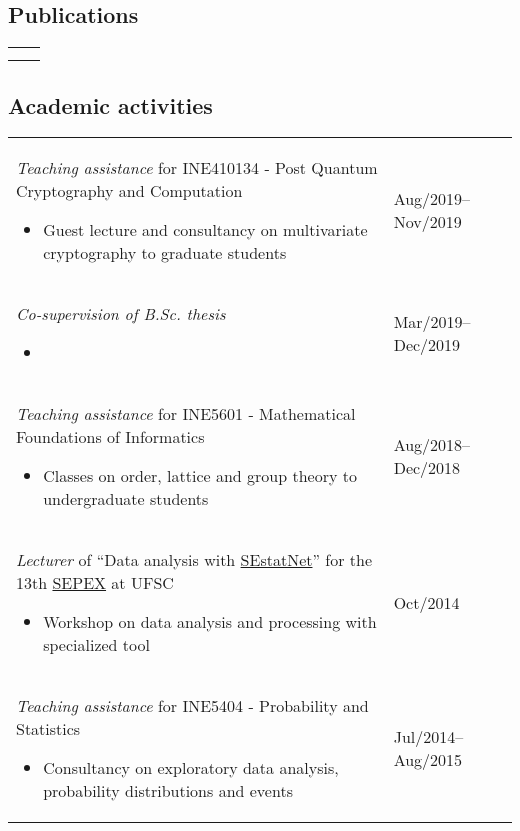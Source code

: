 \documentclass[12pt]{article}
\makeatletter
\newenvironment{datetable}
  {\newcolumntype{R}{>{\raggedleft\arraybackslash}p{0.14\textwidth}}
   \newcolumntype{L}{p{0.84\textwidth}}
   \begin{tabular}{@{\hspace{0mm}}LR}}
  {\end{tabular}}
\newenvironment{contenttable}[1]
  {\subsection*{#1}
   \begin{datetable}}
  {\end{datetable}}
\makeatother
\begin{document}
\begin{contenttable}{Publications}
  \hspace{0mm}
    & \cite{Zambonin:inproc:2019:jul} \vspace{1.25cm} \\

  \hspace{0mm}
    & \cite{Perin:inproc:2018:jun} \\
\end{contenttable}

\begin{contenttable}{Academic activities}
  \textit{Teaching assistance} for INE410134 - Post Quantum Cryptography and
    Computation
  \begin{itemize}
    \item Guest lecture and consultancy on multivariate cryptography to
        graduate students
  \end{itemize} & Aug/2019--Nov/2019 \\

  \textit{Co-supervision of B.Sc. thesis}
  \begin{itemize}
    \item {}
  \end{itemize} & Mar/2019--Dec/2019 \\

  \textit{Teaching assistance} for INE5601 - Mathematical Foundations of
    Informatics
  \begin{itemize}
    \item Classes on order, lattice and group theory to undergraduate students
  \end{itemize} & Aug/2018--Dec/2018 \\

  \textit{Lecturer} of ``Data analysis with
    \href{http://sestatnet.ufsc.br}{SEstatNet}'' for the 13th
    \href{https://sepex.ufsc.br/}{SEPEX} at UFSC
  \begin{itemize}
    \item Workshop on data analysis and processing with specialized tool
  \end{itemize} & Oct/2014 \\

  \textit{Teaching assistance} for INE5404 - Probability and Statistics
  \begin{itemize}
    \item Consultancy on exploratory data analysis, probability distributions
        and events
  \end{itemize} & Jul/2014--Aug/2015 \\
\end{contenttable}
\end{document}

